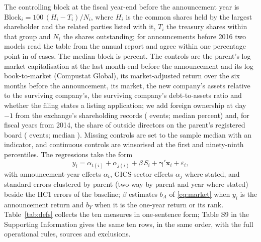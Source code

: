 The controlling block at the fiscal year-end before the announcement year is $\mathrm{Block}_i = 100\,(H_i - T_i)/N_i$, where $H_i$ is the common shares held by the largest shareholder and the related parties listed with it, $T_i$ the treasury shares within that group and $N_i$ the shares outstanding; for announcements before 2016 two models read the table from the annual report and agree within one percentage point in \OwnWithinOne{} of \OwnPairs{} cases. The median block is \BlockMedian{} percent. The controls are the parent's log market capitalisation at the last month-end before the announcement and its log book-to-market (Compustat Global), its market-adjusted return over the six months before the announcement, its market, the new company's assets relative to the surviving company's, the surviving company's debt-to-assets ratio and whether the filing states a listing application; we add foreign ownership at day $-1$ from the exchange's shareholding records (\ForeignCoverage{} events; median \ForeignMedian{} percent) and, for fiscal years from 2014, the share of outside directors on the parent's registered board (\BoardN{} events; median \BoardMedian{}). Missing controls are set to the sample median with an indicator, and continuous controls are winsorised at the first and ninety-ninth percentiles. The regressions take the form
\begin{equation}\label{eq:main}
y_i = \alpha_{t(i)} + \alpha_{j(i)} + \beta\, S_i + \boldsymbol{\gamma}'\mathbf{x}_i + \varepsilon_i,
\end{equation}
with announcement-year effects $\alpha_t$, GICS-sector effects $\alpha_j$ where stated, and standard errors clustered by parent (two-way by parent and year where stated) beside the HC1 errors of the baseline; $\beta$ estimates $b_A$ of \eqref{eq:market} when $y_i$ is the announcement return and $b_Y$ when it is the one-year return or its rank. Table~\ref{tab:defs} collects the ten measures in one-sentence form; Table S9 in the Supporting Information gives the same ten rows, in the same order, with the full operational rules, sources and exclusions.

\begin{table}[htbp]
\centering
\caption{Definitions of the measures used in this paper (short form)}\label{tab:defs}
{\scriptsize\singlespacing\setlength{\tabcolsep}{3pt}}
\end{table}

